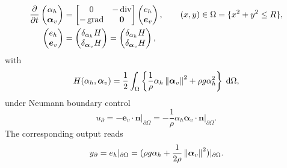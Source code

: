 \begin{equation}
\begin{aligned}
\diffp{}{t}
\begin{pmatrix}
\alpha_h \\
\bm{\alpha}_v \\
\end{pmatrix} &= 
\begin{bmatrix}
0 & -\div \\
-\grad & \bm{0}
\end{bmatrix}
\begin{pmatrix}
e_h\\
\bm{e}_v\\
\end{pmatrix}, \qquad (x,y) \in \Omega = \{x^2 + y^2 \le R \}, \\
\begin{pmatrix}
e_h\\
\bm{e}_v\\
\end{pmatrix} &= \begin{pmatrix}
\delta_{\alpha_h} H\\
\delta_{\bm{\alpha}_v} H\\
\end{pmatrix} = \begin{pmatrix}
\delta_{\alpha_h} H\\
\delta_{\bm{\alpha}_v} H\\
\end{pmatrix},
\end{aligned}
\end{equation}
with 
\begin{equation}
H(\alpha_h, \bm{\alpha}_v) = \energy{\frac{1}{\rho} \alpha_h \norm{\bm{\alpha}_v}^2 + \rho g \alpha_h^2},
\end{equation}
under Neumann boundary control 
\begin{equation}
	{u}_\partial = - \bm{e}_v \cdot \bm{n}\vert_{\partial\Omega} = - \frac{1}{\rho}\alpha_h \bm{\alpha}_v \cdot\bm{n}\vert_{\partial\Omega}. 
\end{equation}
The corresponding output reads
\begin{equation}
{y}_\partial = {e}_h\vert_{\partial\Omega} = (\rho g \alpha_h + \frac{1}{2\rho} \left\|\bm{\alpha}_v\right\|^2)\vert_{\partial\Omega}.
\end{equation}


